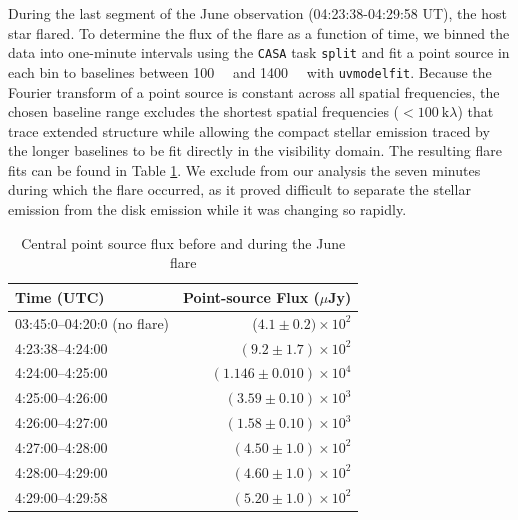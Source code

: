 \documentclass[12pt,oneside]{book}
\begin{document}
During the last segment of the June observation (04:23:38-04:29:58 UT), the host star flared. 
To determine the flux of the flare as a function of time, we binned the data into one-minute intervals using the \texttt{CASA} task \texttt{split} and fit a point source in each bin to baselines between \SI{100}{\kilo \lambda} and \SI{1400}{\kilo \lambda} with \texttt{uvmodelfit}. 
Because the Fourier transform of a point source is constant across all spatial frequencies, the chosen baseline range excludes the shortest spatial frequencies ($< \SI{100}{\kilo \lambda}$) that trace extended structure while 
allowing the compact stellar emission traced by the longer baselines to be fit directly in the visibility domain.
The resulting flare fits can be found in Table \ref{tab:flare fluxes}. 
We exclude from our analysis the seven minutes during which the flare occurred, as it proved difficult to separate the stellar emission from the disk emission while it was changing so rapidly.

\begin{table}	
  \centering
  \begin{tabular}{lr}
    \toprule
    Time (UTC) & Point-source Flux ($\mu$Jy) \\
    \midrule
    03:45:0--04:20:0 (no flare) & ($4.1 \pm 0.2)  \times 10^2$\\
  	4:23:38--4:24:00 & $(9.2 \pm 1.7) \times 10^2$ \\
  	4:24:00--4:25:00 & $(1.146 \pm 0.010) \times 10^4$ \\
  	4:25:00--4:26:00 & $(3.59 \pm 0.10) \times 10^3$ \\
  	4:26:00--4:27:00 & $(1.58 \pm 0.10) \times 10^3$ \\
  	4:27:00--4:28:00 & $(4.50 \pm 1.0) \times 10^2$ \\
  	4:28:00--4:29:00 & $(4.60 \pm 1.0) \times 10^2$ \\
  	4:29:00--4:29:58 & $(5.20 \pm 1.0) \times 10^2$\\
    \bottomrule
  \end{tabular}
	\caption{Central point source flux before and during the June flare}
  \label{tab:flare fluxes}
\end{table}
\end{document}
